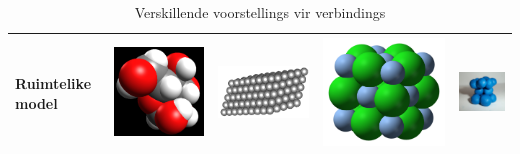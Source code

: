 \begin{table}[H]
\begin{center}
\begin{tabular}{|p{2cm}|l|l|l|l|}
\textbf{Ruimtelike model} & \includegraphics[width=.1\textwidth]{photos/glucose_spacefill.png}  & \includegraphics[width=.2\textwidth]{photos/graphite_spacefill.png} & \includegraphics[width=.1\textwidth]{photos/silverchloride_spacefill_wikipedia.png} & \includegraphics[width=.1\textwidth]{photos/zinc_spacefill.png} \\ \hline
  \end{tabular}
 \end{center}
\caption{Verskillende voorstellings vir verbindings}
\label{tab:atommodels}
\end{table}

